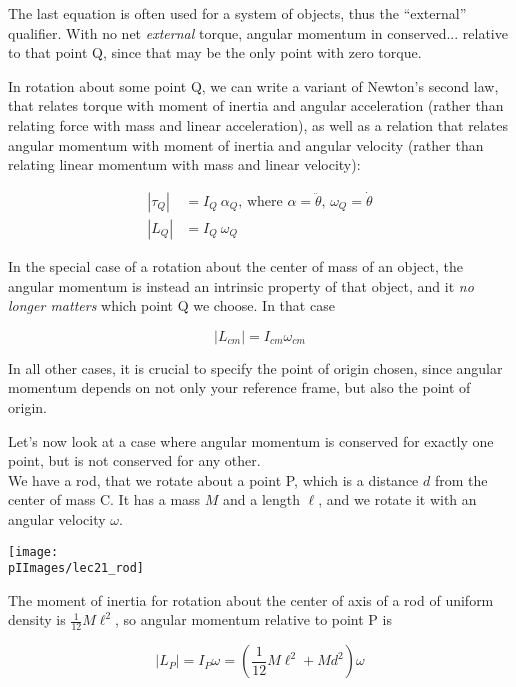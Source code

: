 The last equation is often used for a system of objects, thus the ``external'' qualifier. With no net \emph{external} torque, angular momentum in conserved... relative to that point Q, since that may be the only point with zero torque.

In rotation about some point Q, we can write a variant of Newton's second law, that relates torque with moment of inertia and angular acceleration (rather than relating force with mass and linear acceleration), as well as a relation that relates angular momentum with moment of inertia and angular velocity (rather than relating linear momentum with mass and linear velocity):

\begin{align}
|\tau_Q| &= I_Q\ \alpha_Q \text{, where $\alpha = \ddot{\theta}$, $\omega_Q = \dot{\theta}$}\\
|L_Q|    &= I_Q\ \omega_Q
\end{align}

In the special case of a rotation about the center of mass of an object, the angular momentum is instead an intrinsic property of that object, and it \emph{no longer matters} which point Q we choose. In that case

\begin{equation}
|L_{cm}| = I_{cm} \omega_{cm}
\end{equation}

In all other cases, it is crucial to specify the point of origin chosen, since angular momentum depends on not only your reference frame, but also the point of origin.

Let's now look at a case where angular momentum is conserved for exactly one point, but is not conserved for any other.\\
We have a rod, that we rotate about a point P, which is a distance $d$ from the center of mass C. It has a mass $M$ and a length $\ell$, and we rotate it with an angular velocity $\omega$.

\begin{center}
\texttt{[image: \\pIImages/lec21\_rod]}
\end{center}

The moment of inertia for rotation about the center of axis of a rod of uniform density is $\displaystyle \frac{1}{12} M \ell^2$, so angular momentum relative to point P is

\begin{equation}
|L_P| = I_P \omega = \left(\frac{1}{12} M \ell^2 + M d^2\right) \omega
\end{equation}

